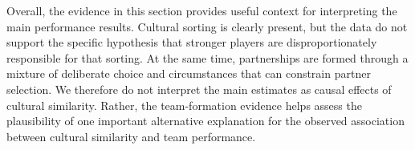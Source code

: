 \documentclass[10pt]{article}
\begin{document}
Overall, the evidence in this section provides useful context for interpreting the main performance results. Cultural sorting is clearly present, but the data do not support the specific hypothesis that stronger players are disproportionately responsible for that sorting. At the same time, partnerships are formed through a mixture of deliberate choice and circumstances that can constrain partner selection. We therefore do not interpret the main estimates as causal effects of cultural similarity. Rather, the team-formation evidence helps assess the plausibility of one important alternative explanation for the observed association between cultural similarity and team performance.

\end{document}
